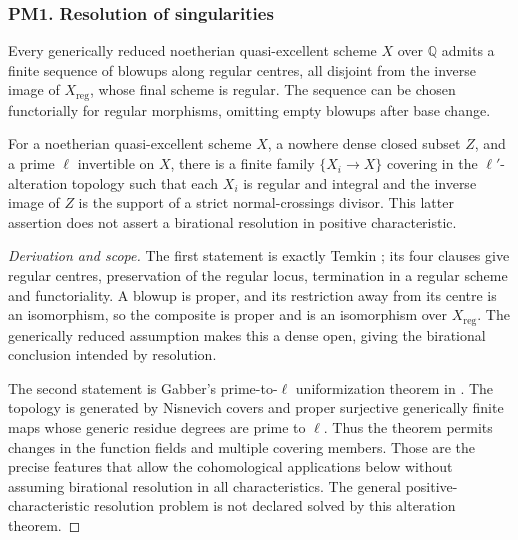 \subsubsection{PM1. Resolution of singularities}
\begin{theorem}\label{B:PM1}
Every generically reduced noetherian quasi-excellent scheme $X$ over $\mathbb Q$ admits a finite sequence of blowups along regular centres, all disjoint from the inverse image of $X_{\mathrm{reg}}$, whose final scheme is regular. The sequence can be chosen functorially for regular morphisms, omitting empty blowups after base change.

For a noetherian quasi-excellent scheme $X$, a nowhere dense closed subset $Z$, and a prime $\ell$ invertible on $X$, there is a finite family $\{X_i\to X\}$ covering in the $\ell'$-alteration topology such that each $X_i$ is regular and integral and the inverse image of $Z$ is the support of a strict normal-crossings divisor. This latter assertion does not assert a birational resolution in positive characteristic.
\end{theorem}
\begin{proof}[Derivation and scope]
The first statement is exactly Temkin \cite[Theorem 1.2.1]{BTemkin2012}; its four clauses give regular centres, preservation of the regular locus, termination in a regular scheme and functoriality. A blowup is proper, and its restriction away from its centre is an isomorphism, so the composite is proper and is an isomorphism over $X_{\mathrm{reg}}$. The generically reduced assumption makes this a dense open, giving the birational conclusion intended by resolution.

The second statement is Gabber's prime-to-$\ell$ uniformization theorem in \cite[Expos\'e IX, Theorem 1.1; Introduction, Theorem 2]{BILO2014}. The topology is generated by Nisnevich covers and proper surjective generically finite maps whose generic residue degrees are prime to $\ell$. Thus the theorem permits changes in the function fields and multiple covering members. Those are the precise features that allow the cohomological applications below without assuming birational resolution in all characteristics. The general positive-characteristic resolution problem is not declared solved by this alteration theorem.
\end{proof}

